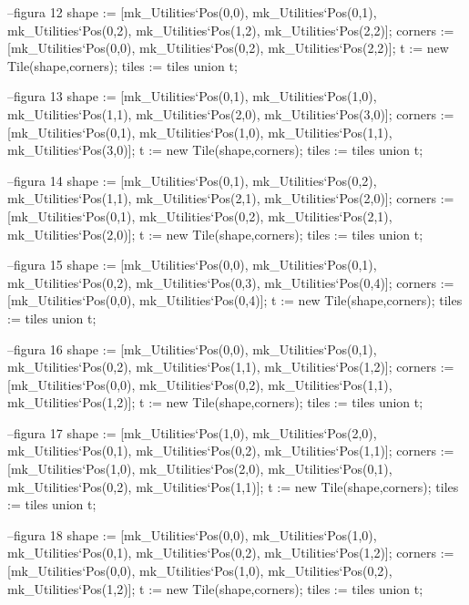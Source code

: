 \begin{vdm_al}
          --figura 12
          shape := [mk_Utilities`Pos(0,0), mk_Utilities`Pos(0,1), mk_Utilities`Pos(0,2),
       mk_Utilities`Pos(1,2), mk_Utilities`Pos(2,2)];
          corners := [mk_Utilities`Pos(0,0), mk_Utilities`Pos(0,2), mk_Utilities`Pos(2,2)];
          t := new Tile(shape,corners); 
          tiles := tiles union {t};
          
          --figura 13
          shape := [mk_Utilities`Pos(0,1), mk_Utilities`Pos(1,0), mk_Utilities`Pos(1,1),
       mk_Utilities`Pos(2,0), mk_Utilities`Pos(3,0)];
          corners := [mk_Utilities`Pos(0,1), mk_Utilities`Pos(1,0), mk_Utilities`Pos(1,1),
       mk_Utilities`Pos(3,0)];
          t := new Tile(shape,corners); 
          tiles := tiles union {t};
          
          --figura 14
          shape := [mk_Utilities`Pos(0,1), mk_Utilities`Pos(0,2), mk_Utilities`Pos(1,1),
       mk_Utilities`Pos(2,1), mk_Utilities`Pos(2,0)];
          corners := [mk_Utilities`Pos(0,1), mk_Utilities`Pos(0,2), mk_Utilities`Pos(2,1),
       mk_Utilities`Pos(2,0)];
          t := new Tile(shape,corners); 
          tiles := tiles union {t};
          
          --figura 15
          shape := [mk_Utilities`Pos(0,0), mk_Utilities`Pos(0,1), mk_Utilities`Pos(0,2),
       mk_Utilities`Pos(0,3), mk_Utilities`Pos(0,4)];
          corners := [mk_Utilities`Pos(0,0), mk_Utilities`Pos(0,4)];
          t := new Tile(shape,corners); 
          tiles := tiles union {t};
          
          --figura 16
          shape := [mk_Utilities`Pos(0,0), mk_Utilities`Pos(0,1), mk_Utilities`Pos(0,2),
       mk_Utilities`Pos(1,1), mk_Utilities`Pos(1,2)];
          corners := [mk_Utilities`Pos(0,0), mk_Utilities`Pos(0,2), mk_Utilities`Pos(1,1),
       mk_Utilities`Pos(1,2)];
          t := new Tile(shape,corners); 
          tiles := tiles union {t};
          
          --figura 17
          shape := [mk_Utilities`Pos(1,0), mk_Utilities`Pos(2,0), mk_Utilities`Pos(0,1),
       mk_Utilities`Pos(0,2), mk_Utilities`Pos(1,1)];
          corners := [mk_Utilities`Pos(1,0), mk_Utilities`Pos(2,0), mk_Utilities`Pos(0,1),
       mk_Utilities`Pos(0,2), mk_Utilities`Pos(1,1)];
          t := new Tile(shape,corners); 
          tiles := tiles union {t};
          
          --figura 18
          shape := [mk_Utilities`Pos(0,0), mk_Utilities`Pos(1,0), mk_Utilities`Pos(0,1),
       mk_Utilities`Pos(0,2), mk_Utilities`Pos(1,2)];
          corners := [mk_Utilities`Pos(0,0), mk_Utilities`Pos(1,0), mk_Utilities`Pos(0,2),
       mk_Utilities`Pos(1,2)];
          t := new Tile(shape,corners); 
          tiles := tiles union {t};
          

\end{vdm_al}
